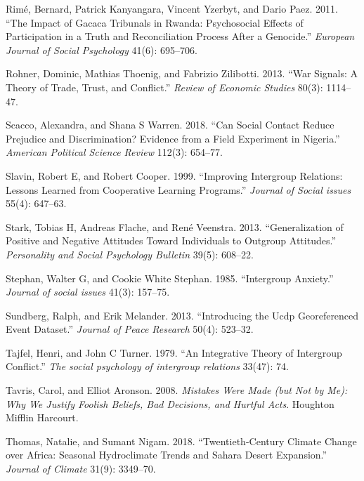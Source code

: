 \documentclass[11pt]{article}
\begin{document}
\leavevmode\hypertarget{ref-rime2011impact}{}%
Rimé, Bernard, Patrick Kanyangara, Vincent Yzerbyt, and Dario Paez.
2011. ``The Impact of Gacaca Tribunals in Rwanda: Psychosocial Effects
of Participation in a Truth and Reconciliation Process After a
Genocide.'' \emph{European Journal of Social Psychology} 41(6):
695--706.

\leavevmode\hypertarget{ref-rohner2013war}{}%
Rohner, Dominic, Mathias Thoenig, and Fabrizio Zilibotti. 2013. ``War
Signals: A Theory of Trade, Trust, and Conflict.'' \emph{Review of
Economic Studies} 80(3): 1114--47.

\leavevmode\hypertarget{ref-scacco2018nigeria}{}%
Scacco, Alexandra, and Shana S Warren. 2018. ``Can Social Contact Reduce
Prejudice and Discrimination? Evidence from a Field Experiment in
Nigeria.'' \emph{American Political Science Review} 112(3): 654--77.

\leavevmode\hypertarget{ref-slavin1999improving}{}%
Slavin, Robert E, and Robert Cooper. 1999. ``Improving Intergroup
Relations: Lessons Learned from Cooperative Learning Programs.''
\emph{Journal of Social issues} 55(4): 647--63.

\leavevmode\hypertarget{ref-stark2013generalization}{}%
Stark, Tobias H, Andreas Flache, and René Veenstra. 2013.
``Generalization of Positive and Negative Attitudes Toward Individuals
to Outgroup Attitudes.'' \emph{Personality and Social Psychology
Bulletin} 39(5): 608--22.

\leavevmode\hypertarget{ref-stephan1985intergroup}{}%
Stephan, Walter G, and Cookie White Stephan. 1985. ``Intergroup
Anxiety.'' \emph{Journal of social issues} 41(3): 157--75.

\leavevmode\hypertarget{ref-ucdp}{}%
Sundberg, Ralph, and Erik Melander. 2013. ``Introducing the Ucdp
Georeferenced Event Dataset.'' \emph{Journal of Peace Research} 50(4):
523--32.

\leavevmode\hypertarget{ref-tajfel1979integrative}{}%
Tajfel, Henri, and John C Turner. 1979. ``An Integrative Theory of
Intergroup Conflict.'' \emph{The social psychology of intergroup
relations} 33(47): 74.

\leavevmode\hypertarget{ref-tavris2008mistakes}{}%
Tavris, Carol, and Elliot Aronson. 2008. \emph{Mistakes Were Made (but
Not by Me): Why We Justify Foolish Beliefs, Bad Decisions, and Hurtful
Acts}. Houghton Mifflin Harcourt.

\leavevmode\hypertarget{ref-thomas2018sahara}{}%
Thomas, Natalie, and Sumant Nigam. 2018. ``Twentieth-Century Climate
Change over Africa: Seasonal Hydroclimate Trends and Sahara Desert
Expansion.'' \emph{Journal of Climate} 31(9): 3349--70.
\end{document}

